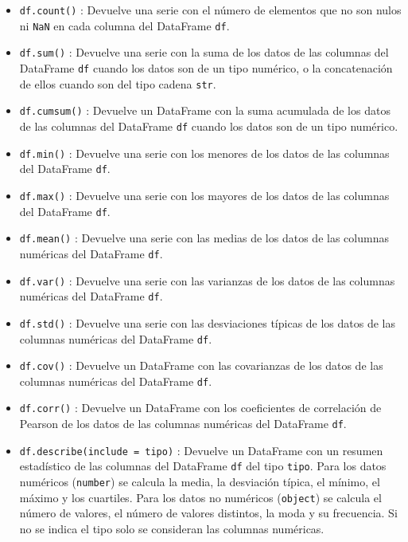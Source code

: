 \documentclass[
  spanish,
  a4paper,
]{scrreport}
\providecommand{\tightlist}{%
  \setlength{\itemsep}{0pt}\setlength{\parskip}{0pt}}
\begin{document}
\begin{itemize}
\tightlist
\item
  \texttt{df.count()} : Devuelve una serie con el número de elementos
  que no son nulos ni \texttt{NaN} en cada columna del DataFrame
  \texttt{df}.
\item
  \texttt{df.sum()} : Devuelve una serie con la suma de los datos de las
  columnas del DataFrame \texttt{df} cuando los datos son de un tipo
  numérico, o la concatenación de ellos cuando son del tipo cadena
  \texttt{str}.
\item
  \texttt{df.cumsum()} : Devuelve un DataFrame con la suma acumulada de
  los datos de las columnas del DataFrame \texttt{df} cuando los datos
  son de un tipo numérico.
\item
  \texttt{df.min()} : Devuelve una serie con los menores de los datos de
  las columnas del DataFrame \texttt{df}.
\item
  \texttt{df.max()} : Devuelve una serie con los mayores de los datos de
  las columnas del DataFrame \texttt{df}.
\item
  \texttt{df.mean()} : Devuelve una serie con las medias de los datos de
  las columnas numéricas del DataFrame \texttt{df}.
\item
  \texttt{df.var()} : Devuelve una serie con las varianzas de los datos
  de las columnas numéricas del DataFrame \texttt{df}.
\item
  \texttt{df.std()} : Devuelve una serie con las desviaciones típicas de
  los datos de las columnas numéricas del DataFrame \texttt{df}.
\item
  \texttt{df.cov()} : Devuelve un DataFrame con las covarianzas de los
  datos de las columnas numéricas del DataFrame \texttt{df}.
\item
  \texttt{df.corr()} : Devuelve un DataFrame con los coeficientes de
  correlación de Pearson de los datos de las columnas numéricas del
  DataFrame \texttt{df}.
\item
  \texttt{df.describe(include\ =\ tipo)} : Devuelve un DataFrame con un
  resumen estadístico de las columnas del DataFrame \texttt{df} del tipo
  \texttt{tipo}. Para los datos numéricos (\texttt{number}) se calcula
  la media, la desviación típica, el mínimo, el máximo y los cuartiles.
  Para los datos no numéricos (\texttt{object}) se calcula el número de
  valores, el número de valores distintos, la moda y su frecuencia. Si
  no se indica el tipo solo se consideran las columnas numéricas.
\end{itemize}
\end{document}

